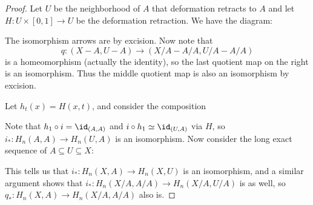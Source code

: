 \begin{proof}
  Let $U$ be the neighborhood of $A$ that deformation
  retracts to $A$ and let $H : U \times [0, 1] \to U$
  be the deformation retraction. We have the
  diagram:
  \begin{center}
  \end{center}
  The isomorphism arrows are by excision. Now note
  that
  \[
    q : (X - A, U - A) \to (X / A - A / A, U / A - A / A)
  \]
  is a homeomorphism (actually the identity), so
  the last quotient map on the right is an isomorphism.
  Thus the middle quotient map is also an isomorphism
  by excision.

  Let $h_t(x) = H(x, t)$, and consider the composition
  \begin{center}
  \end{center}
  Note that $h_1 \circ i = \id_{(A, A)}$ and
  $i \circ h_1 \simeq \id_{(U, A)}$ via $H$, so
  $i_* : H_n(A, A) \to H_n(U, A)$ is an isomorphism.
  Now consider the long exact sequence of
  $A \subseteq U \subseteq X$:
  \begin{center}
  \end{center}
  This tells us that $i_* : H_n(X, A) \to H_n(X, U)$
  is an isomorphism, and a similar argument shows that
  $i_* : H_n(X / A, A / A) \to H_n(X / A, U / A)$
  is as well, so $q_* : H_n(X, A) \to H_n(X / A, A / A)$
  also is.
\end{proof}
